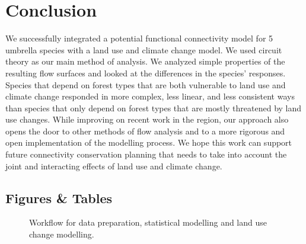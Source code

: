 \section{Conclusion}

We successfully integrated a potential functional connectivity model for 5 umbrella species with a land use and climate change model. We used circuit theory as our main method of analysis. We analyzed simple properties of the resulting flow surfaces and looked at the differences in the species’ responses. Species that depend on forest types that are both vulnerable to land use and climate change responded in more complex, less linear, and less consistent ways than species that only depend on forest types that are mostly threatened by land use changes. While improving on recent work in the region, our approach also opens the door to other methods of flow analysis and to a more rigorous and open implementation of the modelling process. We hope this work can support future connectivity conservation planning that needs to take into account the joint and interacting effects of land use and climate change. \\


\newpage
\begin{center}
\section*{Figures \& Tables}
\end{center}


\begin{figure}[h]
\caption{Workflow for data preparation, statistical modelling and land use change modelling.}
\label{fig:workflow1}
\end{figure}
\clearpage

